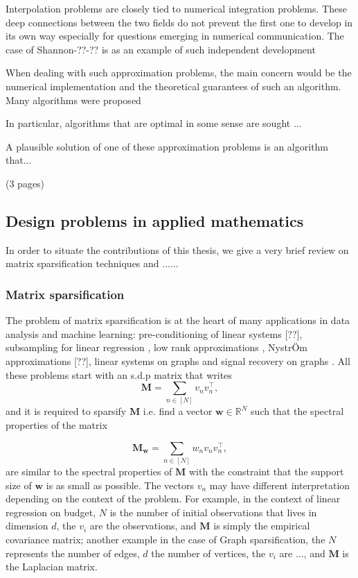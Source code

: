 \documentclass[twoside,11pt]{book}
\DeclareMathOperator{\Tran}{\intercal}
\begin{document}
Interpolation problems are closely tied to numerical integration problems. These deep connections between the two fields do not prevent the first one to develop in its own way especially for questions emerging in numerical communication. The case of Shannon-??-?? is as an example of such independent development




When dealing with such approximation problems, the main concern would be the numerical implementation and the theoretical guarantees of such an algorithm. Many algorithms were proposed



In particular, algorithms that are optimal in some sense are sought ...

A plausible solution of one of these approximation problems is an algorithm that...


(3 pages)
\subsection{Design problems in applied mathematics}
In order to situate the contributions of this thesis, we give a very brief review on  matrix sparsification techniques and ......
\subsubsection{Matrix sparsification}
The problem of matrix sparsification is at the heart of many applications in data analysis and machine learning: pre-conditioning of linear systems [??], subsampling for linear regression \citep*{DrMaMu06}, low rank approximations \citep*{DrMaMu07}, NystrÖm approximations [??], linear systems on graphs \citep*{SpTe04,SpSr11} and signal recovery on graphs \citep*{PuTrGrVa18}. All these problems start with an s.d.p matrix that writes
\begin{equation}
\bm{M} = \sum\limits_{n \in [N]} v_{n}v_{n}^{\Tran},
\end{equation}
and it is required to sparsify $\bm{M}$ i.e. find a vector $\bm{w} \in \mathbb{R}^{N}$ such that the spectral properties of the matrix

\begin{equation}
\bm{M}_{\bm{w}} = \sum\limits_{n \in [N]} w_{n} v_{n}v_{n}^{\Tran},
\end{equation}
are similar to the spectral properties of $\bm{M}$ with the constraint that the support size of $\bm{w}$ is as small as possible. 
The vectors $v_{n}$ may have different interpretation depending on the context of the problem. For example, in the context of linear regression on budget, $N$ is the number of initial observations that lives in dimension $d$, the $v_{i}$ are the observations, and $\bm{M}$ is simply the empirical covariance matrix; another example in the case of Graph sparsification, the $N$ represents the number of edges, $d$ the number of vertices, the $v_{i}$ are ..., and $\bm{M}$ is the Laplacian matrix.
\end{document}
